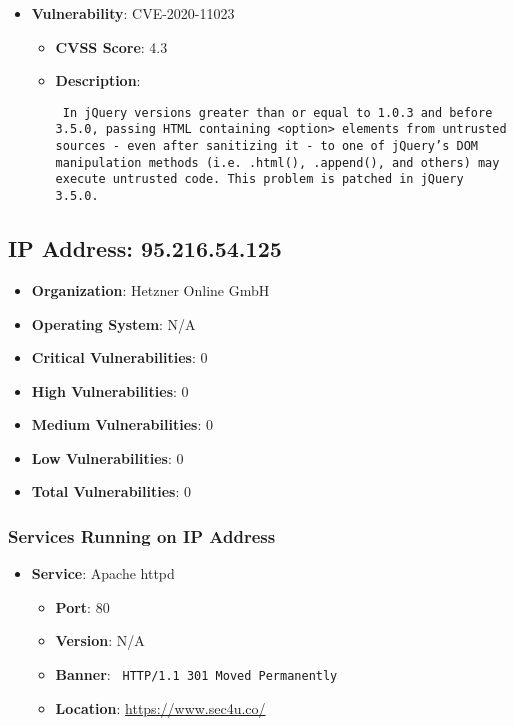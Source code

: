 \documentclass{article}
\begin{document}
\begin{itemize}
        \item \textbf{Vulnerability}: CVE-2020-11023
        \begin{itemize}
            \item \textbf{CVSS Score}:  4.3 
            \item \textbf{Description}: \parbox{\linewidth}{\texttt{ In jQuery versions greater than or equal to 1.0.3 and before 3.5.0, passing HTML containing <option> elements from untrusted sources - even after sanitizing it - to one of jQuery's DOM manipulation methods (i.e. .html(), .append(), and others) may execute untrusted code. This problem is patched in jQuery 3.5.0. }}
        \end{itemize}
    
\end{itemize}


\clearpage



\subsection*{IP Address: 95.216.54.125}

\begin{itemize}
    \item \textbf{Organization}: Hetzner Online GmbH
    \item \textbf{Operating System}:  N/A 
    \item \textbf{Critical Vulnerabilities}: 0
    \item \textbf{High Vulnerabilities}: 0
    \item \textbf{Medium Vulnerabilities}: 0
    \item \textbf{Low Vulnerabilities}: 0
    \item \textbf{Total Vulnerabilities}: 0
\end{itemize}

\subsubsection*{Services Running on IP Address}

\begin{itemize}
    
        \item \textbf{Service}: Apache httpd
        \begin{itemize}
            \item \textbf{Port}: 80
            \item \textbf{Version}:  N/A 
            \item \textbf{Banner}: \texttt{ HTTP/1.1 301 Moved Permanently
 }
            \item \textbf{Location}: \href{ https://www.sec4u.co/ }{ https://www.sec4u.co/ }
        \end{itemize}
    
\end{itemize}
\end{document}
